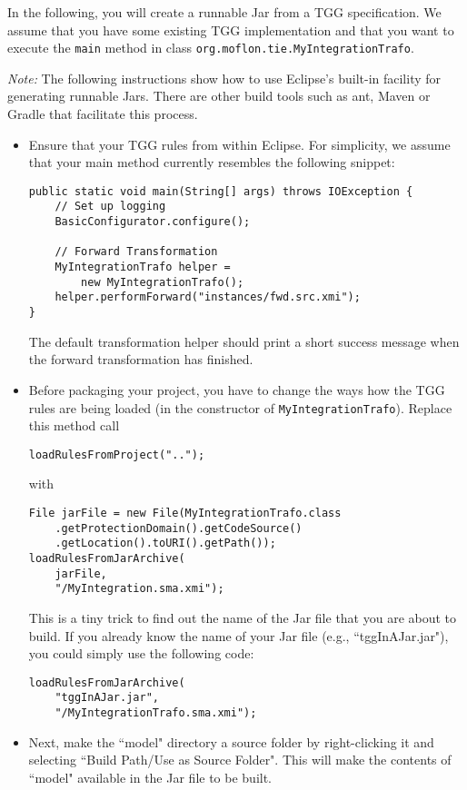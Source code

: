 In the following, you will create a runnable Jar from a TGG specification.
We assume that you have some existing TGG implementation and that you want to execute the \texttt{main} method in class \texttt{org.moflon.tie.MyIntegration\-Trafo}.

\emph{Note:}
The following instructions show how to use Eclipse's built-in facility for generating runnable Jars.
There are other build tools such as ant, Maven or Gradle that facilitate this process.

\begin{itemize}
    
\item 
Ensure that your TGG rules from within Eclipse.
For simplicity, we assume that your main method currently resembles the following snippet:
\begin{lstlisting}
public static void main(String[] args) throws IOException {
    // Set up logging
    BasicConfigurator.configure();

    // Forward Transformation
    MyIntegrationTrafo helper = 
        new MyIntegrationTrafo();
    helper.performForward("instances/fwd.src.xmi");
}
\end{lstlisting}
The default transformation helper should print a short success message when the forward transformation has finished.

\item 
Before packaging your project, you have to change the ways how the TGG rules are being loaded (in the constructor of \texttt{MyIntegration\-Trafo}).
Replace this method call
\begin{lstlisting}
loadRulesFromProject("..");
\end{lstlisting}
with
\begin{lstlisting}
File jarFile = new File(MyIntegrationTrafo.class
    .getProtectionDomain().getCodeSource()
    .getLocation().toURI().getPath());
loadRulesFromJarArchive(
    jarFile,
    "/MyIntegration.sma.xmi");
\end{lstlisting}
This is a tiny trick to find out the name of the Jar file that you are about to build.
If you already know the name of your Jar file (e.g., ``tggInAJar.jar"), you could simply use the following code:
\begin{lstlisting}
loadRulesFromJarArchive(
    "tggInAJar.jar",
    "/MyIntegrationTrafo.sma.xmi");
\end{lstlisting}


\item 
Next, make the ``model" directory a source folder by right-clicking it and selecting ``Build Path/Use as Source Folder".
This will make the contents of ``model" available in the Jar file to be built.



\end{itemize}
